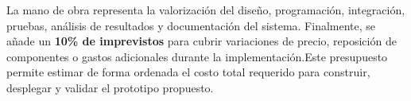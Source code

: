 La mano de obra representa la valorización del diseño, programación, integración, pruebas, análisis de resultados y documentación del sistema. Finalmente, se añade un \textbf{10\% de imprevistos} para cubrir variaciones de precio, reposición de componentes o gastos adicionales durante la implementación.Este presupuesto permite estimar de forma ordenada el costo total requerido para construir, desplegar y validar el prototipo propuesto.